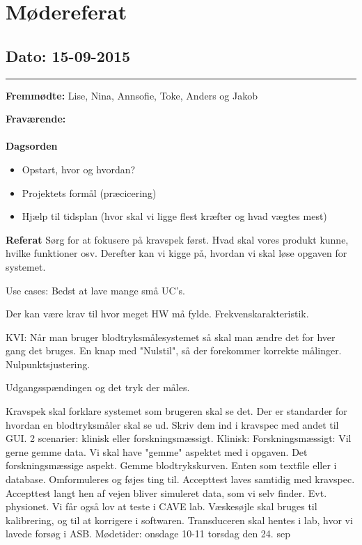 \chapter{Mødereferat}

\section{Dato: 15-09-2015}
\hrule

\textbf{Fremmødte:} Lise, Nina, Annsofie, Toke, Anders og Jakob

\textbf{Fraværende:} 
\\
\\
\textbf{Dagsorden}
\begin{itemize}
	\item Opstart, hvor og hvordan?
	\item Projektets formål (præcicering)
	\item Hjælp til tidsplan (hvor skal vi ligge flest kræfter og hvad vægtes mest)
\end{itemize}

\textbf{Referat} 
Sørg for at fokusere på kravspek først. Hvad skal vores produkt kunne, hvilke funktioner osv.
Derefter kan vi kigge på, hvordan vi skal løse opgaven for systemet.

Use cases: Bedst at lave mange små UC's. 

Der kan være krav til hvor meget HW må fylde.
Frekvenskarakteristik.

KVI: Når man bruger blodtryksmålesystemet så skal man ændre det for hver gang det bruges. En knap med "Nulstil", så der forekommer korrekte målinger. Nulpunktsjustering.

Udgangsspændingen og det tryk der måles.

Kravspek skal forklare systemet som brugeren skal se det.
Der er standarder for hvordan en blodtryksmåler skal se ud. 
Skriv dem ind i kravspec med andet til GUI.
2 scenarier: klinisk eller forskningsmæssigt. 
Klinisk:
Forskningsmæssigt: Vil gerne gemme data. Vi skal have "gemme" aspektet med i opgaven. Det forskningsmæssige aspekt. Gemme blodtrykskurven. Enten som textfile eller i database.
Omformuleres og føjes ting til.
Accepttest laves samtidig med kravspec. 
Accepttest langt hen af vejen bliver simuleret data, som vi selv finder. Evt. physionet.
Vi får også lov at teste i CAVE lab.
Væskesøjle skal bruges til kalibrering, og til at korrigere i softwaren. 
Transduceren skal hentes i lab, hvor vi lavede forsøg i ASB.
Mødetider: onsdage 10-11
torsdag den 24. sep 

